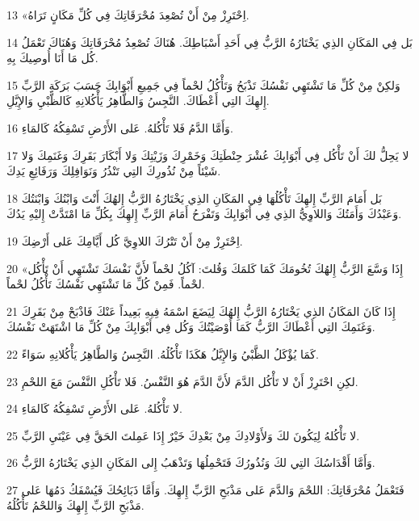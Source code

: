 \par 13 «اِحْتَرِزْ مِنْ أَنْ تُصْعِدَ مُحْرَقَاتِكَ فِي كُلِّ مَكَانٍ تَرَاهُ.
\par 14 بَل فِي المَكَانِ الذِي يَخْتَارُهُ الرَّبُّ فِي أَحَدِ أَسْبَاطِكَ. هُنَاكَ تُصْعِدُ مُحْرَقَاتِكَ وَهُنَاكَ تَعْمَلُ كُل مَا أَنَا أُوصِيكَ بِهِ.
\par 15 وَلكِنْ مِنْ كُلِّ مَا تَشْتَهِي نَفْسُكَ تَذْبَحُ وَتَأْكُلُ لحْماً فِي جَمِيعِ أَبْوَابِكَ حَسَبَ بَرَكَةِ الرَّبِّ إِلهِكَ التِي أَعْطَاكَ. النَّجِسُ وَالطَّاهِرُ يَأْكُلانِهِ كَالظَّبْيِ وَالإِيَّلِ.
\par 16 وَأَمَّا الدَّمُ فَلا تَأْكُلهُ. عَلى الأَرْضِ تَسْفِكُهُ كَالمَاءِ.
\par 17 لا يَحِلُّ لكَ أَنْ تَأْكُل فِي أَبْوَابِكَ عُشْرَ حِنْطَتِكَ وَخَمْرِكَ وَزَيْتِكَ وَلا أَبْكَارَ بَقَرِكَ وَغَنَمِكَ وَلا شَيْئاً مِنْ نُذُورِكَ التِي تَنْذُرُ وَنَوَافِلِكَ وَرَفَائِعِ يَدِكَ.
\par 18 بَل أَمَامَ الرَّبِّ إِلهِكَ تَأْكُلُهَا فِي المَكَانِ الذِي يَخْتَارُهُ الرَّبُّ إِلهُكَ أَنْتَ وَابْنُكَ وَابْنَتُكَ وَعَبْدُكَ وَأَمَتُكَ وَاللاوِيُّ الذِي فِي أَبْوَابِكَ وَتَفْرَحُ أَمَامَ الرَّبِّ إِلهِكَ بِكُلِّ مَا امْتَدَّتْ إِليْهِ يَدُكَ.
\par 19 اِحْتَرِزْ مِنْ أَنْ تَتْرُكَ اللاوِيَّ كُل أَيَّامِكَ عَلى أَرْضِكَ.
\par 20 «إِذَا وَسَّعَ الرَّبُّ إِلهُكَ تُخُومَكَ كَمَا كَلمَكَ وَقُلتَ: آكُلُ لحْماً لأَنَّ نَفْسَكَ تَشْتَهِي أَنْ تَأْكُل لحْماً. فَمِنْ كُلِّ مَا تَشْتَهِي نَفْسُكَ تَأْكُلُ لحْماً.
\par 21 إِذَا كَانَ المَكَانُ الذِي يَخْتَارُهُ الرَّبُّ إِلهُكَ لِيَضَعَ اسْمَهُ فِيهِ بَعِيداً عَنْكَ فَاذْبَحْ مِنْ بَقَرِكَ وَغَنَمِكَ التِي أَعْطَاكَ الرَّبُّ كَمَا أَوْصَيْتُكَ وَكُل فِي أَبْوَابِكَ مِنْ كُلِّ مَا اشْتَهَتْ نَفْسُكَ.
\par 22 كَمَا يُؤْكَلُ الظَّبْيُ وَالإِيَّلُ هَكَذَا تَأْكُلُهُ. النَّجِسُ وَالطَّاهِرُ يَأْكُلانِهِ سَوَاءً.
\par 23 لكِنِ احْتَرِزْ أَنْ لا تَأْكُل الدَّمَ لأَنَّ الدَّمَ هُوَ النَّفْسُ. فَلا تَأْكُلِ النَّفْسَ مَعَ اللحْمِ.
\par 24 لا تَأْكُلهُ. عَلى الأَرْضِ تَسْفِكُهُ كَالمَاءِ.
\par 25 لا تَأْكُلهُ لِيَكُونَ لكَ وَلأَوْلادِكَ مِنْ بَعْدِكَ خَيْرٌ إِذَا عَمِلتَ الحَقَّ فِي عَيْنَيِ الرَّبِّ.
\par 26 وَأَمَّا أَقْدَاسُكَ التِي لكَ وَنُذُورُكَ فَتَحْمِلُهَا وَتَذْهَبُ إِلى المَكَانِ الذِي يَخْتَارُهُ الرَّبُّ.
\par 27 فَتَعْمَلُ مُحْرَقَاتِكَ: اللحْمَ وَالدَّمَ عَلى مَذْبَحِ الرَّبِّ إِلهِكَ. وَأَمَّا ذَبَائِحُكَ فَيُسْفَكُ دَمُهَا عَلى مَذْبَحِ الرَّبِّ إِلهِكَ وَاللحْمُ تَأْكُلُهُ.

